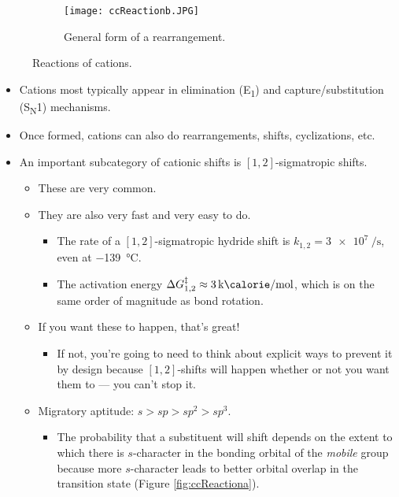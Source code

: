 \documentclass[../notes.tex]{subfiles}
\begin{document}
\begin{itemize}
\begin{figure}[H]
\begin{subfigure}[b]{\linewidth}
            \centering
            \texttt{[image: ccReactionb.JPG]}
            \caption{General form of a rearrangement.}
            \label{fig:ccReactionb}
        \end{subfigure}
        \caption{Reactions of cations.}
        \label{fig:ccReaction}
    \end{figure}
    \begin{itemize}
        \item Cations most typically appear in elimination (E\textsubscript{1}) and capture/substitution (S\textsubscript{N}1) mechanisms.
        \item Once formed, cations can also do rearrangements, shifts, cyclizations, etc.
        \item An important subcategory of cationic shifts is $[1,2]$-sigmatropic shifts.
        \begin{itemize}
            \item These are very common.
            \item They are also very fast and very easy to do.
            \begin{itemize}
                \item The rate of a $[1,2]$-sigmatropic hydride shift is $k_{1,2}=\SI{3e7}{\per\second}$, even at \SI{-139}{\celsius}.
                \item The activation energy $\Delta G_{1,2}^\ddagger\approx\kcal{3}$, which is on the same order of magnitude as bond rotation.
            \end{itemize}
            \item If you want these to happen, that's great!
            \begin{itemize}
                \item If not, you're going to need to think about explicit ways to prevent it by design because $[1,2]$-shifts will happen whether or not you want them to --- you can't stop it.
            \end{itemize}
            \item Migratory aptitude: $s>sp>sp^2>sp^3$.
            \begin{itemize}
                \item The probability that a substituent will shift depends on the extent to which there is $s$-character in the bonding orbital of the \emph{mobile} group because more $s$-character leads to better orbital overlap in the transition state (Figure \ref{fig:ccReactiona}).
            \end{itemize}

\end{itemize}
\end{itemize}
\end{itemize}
\end{document}
